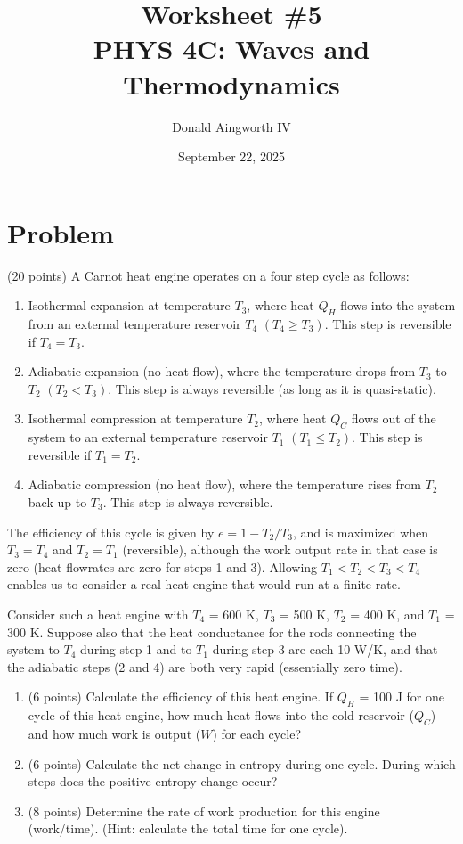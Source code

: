 \documentclass[12pt]{article}
\title{
    Worksheet \#5
    \\  \small
    PHYS 4C: Waves and Thermodynamics
    }
\author{Donald Aingworth IV}
\date{September 22, 2025}
\begin{document}

    \maketitle

    \section{Problem}
        (20 points) A Carnot heat engine operates on a four step cycle as follows:
        \begin{enumerate}
            \item Isothermal expansion at temperature $T_3$, where heat $Q_H$ ﬂows into the system from an external temperature reservoir $T_4$ $(T_4 \geq T_3)$. 
            This step is reversible if $T_4 = T_3$.
            \item Adiabatic expansion (no heat ﬂow), where the temperature drops from $T_3$ to $T_2$ $(T_2 < T_3)$. 
            This step is always reversible (as long as it is quasi-static).
            \item Isothermal compression at temperature $T_2$, where heat $Q_C$ ﬂows out of the system to an external temperature reservoir $T_1$ $(T_1 \leq T_2)$. 
            This step is reversible if $T_1 = T_2$.
            \item Adiabatic compression (no heat ﬂow), where the temperature rises from $T_2$ back up to $T_3$. 
            This step is always reversible.
        \end{enumerate}
        
        The efficiency of this cycle is given by $e = 1 - T_2/T_3$, and is maximized when $T_3 = T_4$ and $T_2 = T_1$ (reversible), although the work output rate in that case is zero (heat ﬂowrates are zero for steps 1 and 3). 
        Allowing $T_1 < T_2 < T_3 < T_4$ enables us to consider a real heat engine that would run at a ﬁnite rate.
        
        Consider such a heat engine with $T_4$ = 600 K, $T_3$ = 500 K, $T_2$ = 400 K, and $T_1$ = 300 K.
        Suppose also that the heat conductance for the rods connecting the system to $T_4$ during step 1 and to $T_1$ during step 3 are each 10 W/K, and that the adiabatic steps (2 and 4) are both very rapid (essentially zero time).
        \begin{enumerate}[label=(\alph*)]
            \item (6 points) Calculate the eﬃciency of this heat engine. If $Q_H$ = 100 J for one cycle of this heat engine, how much heat ﬂows into the cold reservoir ($Q_C$) and how much work is output ($W$) for each cycle?
            \item (6 points) Calculate the net change in entropy during one cycle. 
            During which steps does the positive entropy change occur?
            \item (8 points) Determine the rate of work production for this engine \\(work/time). 
            (Hint: calculate the total time for one cycle).
        \end{enumerate}
\end{document}
